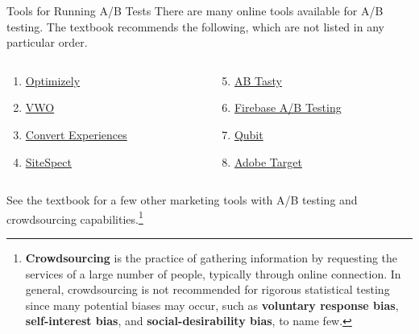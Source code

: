 \documentclass[pdf]{beamer}
\newcommand{\empr}[1]{{\color{franklinblue}\textbf{#1}}}
\theoremstyle{remark}
\theoremstyle{definition}
\begin{document}
\begin{frame}[t]{Tools for Running A/B Tests}
There are many online tools available for A/B testing.  The textbook recommends the following, which are not listed in any particular order. \\
\vspace{1.5ex}
\begin{columns}[T]
\begin{column}{0.5\textwidth}
\begin{enumerate}
\item \href{https://www.optimizely.com/}{Optimizely}
\vspace{1.0ex}
\item \href{https://vwo.com/}{VWO}
\vspace{1.0ex}
\item \href{https://www.convert.com/}{Convert Experiences}
\vspace{1.0ex}
\item \href{https://www.sitespect.com/}{SiteSpect}
\vspace{1.0ex}
\end{enumerate}
\end{column}
\begin{column}{0.5\textwidth}  %
\begin{enumerate}
  \setcounter{enumi}{4}
\item \href{https://www.abtasty.com/}{AB Tasty}
\vspace{1.0ex}
\item \href{https://firebase.google.com/docs/ab-testing?sjid=15712676071402063705-NA}{Firebase A/B Testing}
\vspace{1.0ex}
\item \href{https://www.qubit.com/}{Qubit} 

\vspace{1.0ex}\item \href{https://business.adobe.com/products/target/adobe-target.html}{Adobe Target}
\vspace{1.0ex}
\end{enumerate} 
\end{column}
\end{columns}
See the textbook for a  few other marketing tools with A/B testing and crowdsourcing capabilities.\footnote{\empr{Crowdsourcing} is the practice of gathering information by requesting the services of a large number of people, typically through online connection. In general, crowdsourcing is not recommended for rigorous statistical testing since many potential biases may occur, such as \empr{voluntary response bias}, \empr{self-interest bias}, and \empr{social-desirability bias}, to name few.}
\end{frame}
\end{document}
